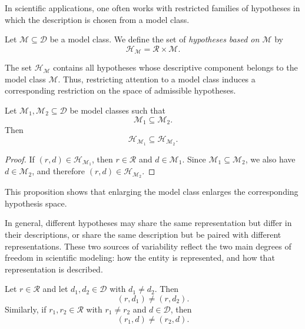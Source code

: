 In scientific applications, one often works with restricted families of hypotheses in which the description is chosen from a model class.

\begin{definition}
\label{def:model_hypotheses}
Let \(\mathcal{M} \subseteq \mathcal{D}\) be a model class. We define the set of \emph{hypotheses based on \(\mathcal{M}\)} by
\[
\mathcal{H}_{\mathcal{M}}
=
\mathcal{R} \times \mathcal{M}.
\]
\end{definition}

The set \(\mathcal{H}_{\mathcal{M}}\) contains all hypotheses whose descriptive component belongs to the model class \(\mathcal{M}\). Thus, restricting attention to a model class induces a corresponding restriction on the space of admissible hypotheses.

\begin{proposition}
\label{prop:model_hypothesis_inclusion}
Let \(\mathcal{M}_1,\mathcal{M}_2 \subseteq \mathcal{D}\) be model classes such that
\[
\mathcal{M}_1 \subseteq \mathcal{M}_2.
\]
Then
\[
\mathcal{H}_{\mathcal{M}_1} \subseteq \mathcal{H}_{\mathcal{M}_2}.
\]
\end{proposition}

\begin{proof}
If \((r,d) \in \mathcal{H}_{\mathcal{M}_1}\), then \(r \in \mathcal{R}\) and \(d \in \mathcal{M}_1\). Since \(\mathcal{M}_1 \subseteq \mathcal{M}_2\), we also have \(d \in \mathcal{M}_2\), and therefore \((r,d) \in \mathcal{H}_{\mathcal{M}_2}\).
\end{proof}

This proposition shows that enlarging the model class enlarges the corresponding hypothesis space.

In general, different hypotheses may share the same representation but differ in their descriptions, or share the same description but be paired with different representations. These two sources of variability reflect the two main degrees of freedom in scientific modeling: how the entity is represented, and how that representation is described.

\begin{proposition}
\label{prop:hypotheses_same_representation}
Let \(r \in \mathcal{R}\) and let \(d_1,d_2 \in \mathcal{D}\) with \(d_1 \neq d_2\). Then
\[
(r,d_1) \neq (r,d_2).
\]
Similarly, if \(r_1,r_2 \in \mathcal{R}\) with \(r_1 \neq r_2\) and \(d \in \mathcal{D}\), then
\[
(r_1,d) \neq (r_2,d).
\]
\end{proposition}

